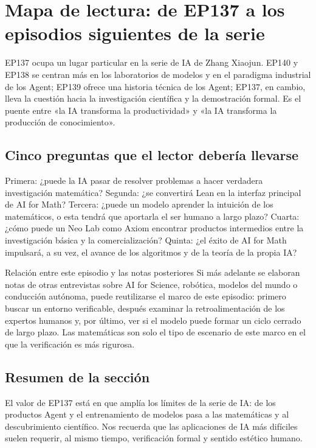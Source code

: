 \section{Mapa de lectura: de EP137 a los episodios siguientes de la serie}

EP137 ocupa un lugar particular en la serie de IA de Zhang Xiaojun. EP140 y EP138 se centran más en los laboratorios de modelos y en el paradigma industrial de los Agent; EP139 ofrece una historia técnica de los Agent; EP137, en cambio, lleva la cuestión hacia la investigación científica y la demostración formal. Es el puente entre «la IA transforma la productividad» y «la IA transforma la producción de conocimiento».

\subsection{Cinco preguntas que el lector debería llevarse}

Primera: ¿puede la IA pasar de resolver problemas a hacer verdadera investigación matemática? Segunda: ¿se convertirá Lean en la interfaz principal de AI for Math? Tercera: ¿puede un modelo aprender la intuición de los matemáticos, o esta tendrá que aportarla el ser humano a largo plazo? Cuarta: ¿cómo puede un Neo Lab como Axiom encontrar productos intermedios entre la investigación básica y la comercialización? Quinta: ¿el éxito de AI for Math impulsará, a su vez, el avance de los algoritmos y de la teoría de la propia IA?

\begin{knowledgebox}{Relación entre este episodio y las notas posteriores}
Si más adelante se elaboran notas de otras entrevistas sobre AI for Science, robótica, modelos del mundo o conducción autónoma, puede reutilizarse el marco de este episodio: primero buscar un entorno verificable, después examinar la retroalimentación de los expertos humanos y, por último, ver si el modelo puede formar un ciclo cerrado de largo plazo. Las matemáticas son solo el tipo de escenario de este marco en el que la verificación es más rigurosa.
\end{knowledgebox}

\subsection{Resumen de la sección}

El valor de EP137 está en que amplía los límites de la serie de IA: de los productos Agent y el entrenamiento de modelos pasa a las matemáticas y al descubrimiento científico. Nos recuerda que las aplicaciones de IA más difíciles suelen requerir, al mismo tiempo, verificación formal y sentido estético humano.
